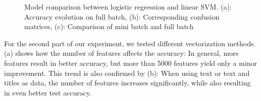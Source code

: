 \documentclass[10pt]{article}
\begin{document}
\begin{figure}[htbp]
\begin{subfigure}[t]{\textwidth}
	\end{subfigure}
	
	\caption{Model comparison between logistic regression and linear SVM. (a): Accuracy evolution on full batch, (b): Corresponding confusion matrices, (c): Comparison of mini batch and full batch}
	\label{Fig 1}
\end{figure}

	For the second part of our experiment, we tested different vectorization methods. (a) shows how the number of features affects the accuracy: In general, more features result in better accuracy, but more than 5000 features yield only a minor improvement. This trend is also confirmed by (b): When using text or text and titles as data, the number of features increases significantly, while also resulting in even better test accuracy.\\
\end{document}
